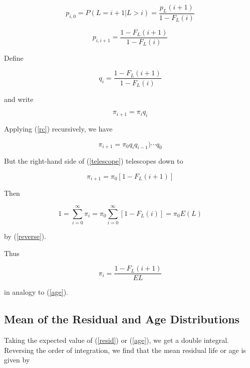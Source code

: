 \begin{equation}
p_{i,0} = P(L = i+1 | L > i) = \frac{p_L(i+1)}{1-F_L(i)}
\end{equation}

\begin{equation}
p_{i,i+1} = \frac{1-F_L(i+1)}{1-F_L(i)}
\end{equation}

Define

\begin{equation}
q_i = \frac{1-F_L(i+1)}{1-F_L(i)}
\end{equation}

and write

\begin{equation}
\label{rc}
\pi_{i+1} = \pi_i q_i
\end{equation}

Applying (\ref{rc}) recursively, we have

\begin{equation}
\label{telescope}
\pi_{i+1} = \pi_0 q_i q_{i-1}) \cdots q_0 
\end{equation}

But the right-hand side of (\ref{telescope}) telescopes down to

\begin{equation}
\pi_{i+1} = \pi_0 [1 - F_L(i+1) ]
\end{equation}

Then

\begin{equation}
1 = \sum_{i=0}^{\infty} \pi_i 
= \pi_0 \sum_{i=0}^{\infty} [1 - F_L(i)]  
= \pi_0 E(L)
\end{equation}

by (\ref{reverse}). 

Thus

\begin{equation}
\label{piage}
\pi_i =  \frac{1 - F_L(i+1)} {EL}
\end{equation}

in analogy to (\ref{age}).

\subsection{Mean of the Residual and Age Distributions}

Taking the expected value of (\ref{resid}) or (\ref{age}), we get a
double integral.  Reversing the order of integration, we find that
the mean residual life or age is given by

